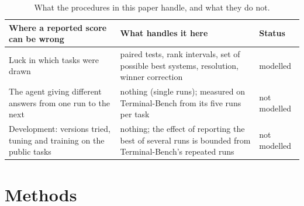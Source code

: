 \documentclass[11pt]{article}
\begin{document}
\begin{table}[h]
\centering\small
\begin{tabular}{p{4.6cm}p{5.4cm}p{4.6cm}}
\toprule
Where a reported score can be wrong & What handles it here & Status \\
\midrule
Luck in which tasks were drawn & paired tests, rank intervals, set of possible best systems, resolution, winner correction & modelled \\
The agent giving different answers from one run to the next & nothing (single runs); measured on Terminal-Bench from its five runs per task & not modelled \\
Development: versions tried, tuning and training on the public tasks & nothing; the effect of reporting the best of several runs is bounded from Terminal-Bench's repeated runs & not modelled \\
\bottomrule
\end{tabular}
\caption{What the procedures in this paper handle, and what they do not.}
\label{tab:scope}
\end{table}

\section{Methods}\label{sec:methods}
\end{document}
